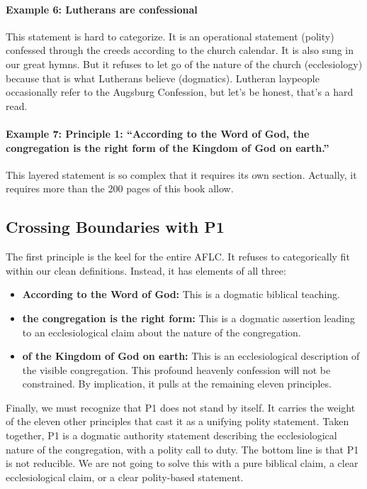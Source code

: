 \paragraph{Example 6: Lutherans are confessional}

This statement is hard to categorize. It is an operational statement (polity) confessed through the creeds according to the church calendar. It is also sung in our great hymns. But it refuses to let go of the nature of the church (ecclesiology) because that is what Lutherans believe (dogmatics). Lutheran laypeople occasionally refer to the Augsburg Confession, but let's be honest, that's a hard read.

 
\paragraph{Example 7: Principle 1: ``According to the Word of God, the congregation is the right form of the Kingdom of God on earth.''}

This layered statement is so complex that it requires its own section. Actually, it requires more than the 200 pages of this book allow.  


\subsection{Crossing Boundaries with P1}

The first principle is the keel for the entire AFLC. It refuses to categorically fit within our clean definitions. Instead, it has elements of all three:


\begin{itemize}
    \item \textbf{According to the Word of God:} This is a dogmatic biblical teaching.

    \item \textbf{the congregation is the right form:} This is a dogmatic assertion leading to an ecclesiological claim about the nature of the congregation.

    \item \textbf{of the Kingdom of God on earth:} This is an ecclesiological description of the visible congregation. This profound heavenly confession will not be constrained. By implication, it pulls at the remaining eleven principles. 
\end{itemize} 


Finally, we must recognize that P1 does not stand by itself. It carries the weight of the eleven other principles that cast it as a unifying polity statement. Taken together, P1 is a dogmatic authority statement describing the ecclesiological nature of the congregation, with a polity call to duty. The bottom line is that P1 is not reducible. We are not going to solve this with a pure biblical claim, a clear ecclesiological claim, or a clear polity-based statement. 

